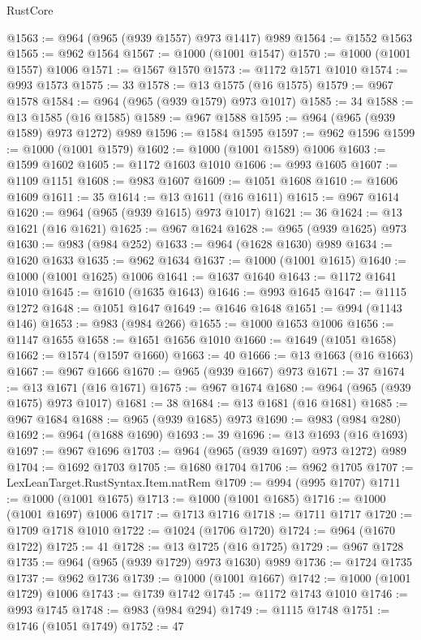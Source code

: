 \begin{lexlean}{RustCore}
\begin{coremodule}
@1563 := @964 (@965 (@939 @1557) @973 @1417) @989
@1564 := @1552 @1563
@1565 := @962 @1564
@1567 := @1000 (@1001 @1547)
@1570 := @1000 (@1001 @1557) @1006
@1571 := @1567 @1570
@1573 := @1172 @1571 @1010
@1574 := @993 @1573
@1575 := 33
@1578 := @13 @1575 (@16 @1575)
@1579 := @967 @1578
@1584 := @964 (@965 (@939 @1579) @973 @1017)
@1585 := 34
@1588 := @13 @1585 (@16 @1585)
@1589 := @967 @1588
@1595 := @964 (@965 (@939 @1589) @973 @1272) @989
@1596 := @1584 @1595
@1597 := @962 @1596
@1599 := @1000 (@1001 @1579)
@1602 := @1000 (@1001 @1589) @1006
@1603 := @1599 @1602
@1605 := @1172 @1603 @1010
@1606 := @993 @1605
@1607 := @1109 @1151
@1608 := @983 @1607
@1609 := @1051 @1608
@1610 := @1606 @1609
@1611 := 35
@1614 := @13 @1611 (@16 @1611)
@1615 := @967 @1614
@1620 := @964 (@965 (@939 @1615) @973 @1017)
@1621 := 36
@1624 := @13 @1621 (@16 @1621)
@1625 := @967 @1624
@1628 := @965 (@939 @1625) @973
@1630 := @983 (@984 @252)
@1633 := @964 (@1628 @1630) @989
@1634 := @1620 @1633
@1635 := @962 @1634
@1637 := @1000 (@1001 @1615)
@1640 := @1000 (@1001 @1625) @1006
@1641 := @1637 @1640
@1643 := @1172 @1641 @1010
@1645 := @1610 (@1635 @1643)
@1646 := @993 @1645
@1647 := @1115 @1272
@1648 := @1051 @1647
@1649 := @1646 @1648
@1651 := @994 (@1143 @146)
@1653 := @983 (@984 @266)
@1655 := @1000 @1653 @1006
@1656 := @1147 @1655
@1658 := @1651 @1656 @1010
@1660 := @1649 (@1051 @1658)
@1662 := @1574 (@1597 @1660)
@1663 := 40
@1666 := @13 @1663 (@16 @1663)
@1667 := @967 @1666
@1670 := @965 (@939 @1667) @973
@1671 := 37
@1674 := @13 @1671 (@16 @1671)
@1675 := @967 @1674
@1680 := @964 (@965 (@939 @1675) @973 @1017)
@1681 := 38
@1684 := @13 @1681 (@16 @1681)
@1685 := @967 @1684
@1688 := @965 (@939 @1685) @973
@1690 := @983 (@984 @280)
@1692 := @964 (@1688 @1690)
@1693 := 39
@1696 := @13 @1693 (@16 @1693)
@1697 := @967 @1696
@1703 := @964 (@965 (@939 @1697) @973 @1272) @989
@1704 := @1692 @1703
@1705 := @1680 @1704
@1706 := @962 @1705
@1707 := LexLeanTarget.RustSyntax.Item.natRem
@1709 := @994 (@995 @1707)
@1711 := @1000 (@1001 @1675)
@1713 := @1000 (@1001 @1685)
@1716 := @1000 (@1001 @1697) @1006
@1717 := @1713 @1716
@1718 := @1711 @1717
@1720 := @1709 @1718 @1010
@1722 := @1024 (@1706 @1720)
@1724 := @964 (@1670 @1722)
@1725 := 41
@1728 := @13 @1725 (@16 @1725)
@1729 := @967 @1728
@1735 := @964 (@965 (@939 @1729) @973 @1630) @989
@1736 := @1724 @1735
@1737 := @962 @1736
@1739 := @1000 (@1001 @1667)
@1742 := @1000 (@1001 @1729) @1006
@1743 := @1739 @1742
@1745 := @1172 @1743 @1010
@1746 := @993 @1745
@1748 := @983 (@984 @294)
@1749 := @1115 @1748
@1751 := @1746 (@1051 @1749)
@1752 := 47

\end{coremodule}
\end{lexlean}
